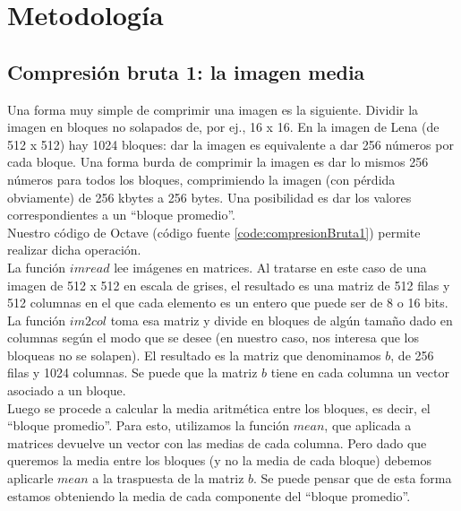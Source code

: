 \documentclass[twocolumn,a4paper,10pt]{article}
\begin{document}

\section{Metodología}

\subsection{Compresi\'on bruta 1: la imagen media}
\label{sec:compresion1}

Una forma muy simple de comprimir una imagen es la siguiente. Dividir la imagen en bloques no solapados de, por ej., 16 x 16. En la imagen de Lena (de 512 x 512) 
hay 1024 bloques: dar la imagen es equivalente a dar 256 n\'umeros por cada bloque. Una forma burda de comprimir la imagen es dar lo mismos 256 n\'umeros para todos 
los bloques, comprimiendo la imagen (con p\'erdida obviamente) de 256 kbytes a 256 bytes. Una posibilidad es dar los valores correspondientes a un ``bloque promedio''.\\

Nuestro c\'odigo de Octave (c\'odigo fuente \ref{code:compresionBruta1}) permite realizar dicha operaci\'on. \\

La funci\'on $imread$ lee im\'agenes en matrices. Al tratarse en este caso de una imagen de 512 x 512 en escala de grises, el resultado es una matriz de 512 filas y 
512 columnas en el que cada elemento es un entero que puede ser de 8 o 16 bits. La funci\'on $im2col$ toma esa matriz y divide en bloques de alg\'un tamaño dado en 
columnas seg\'un el modo que se desee (en nuestro caso, nos interesa que los bloqueas no se solapen). El resultado es la matriz que denominamos $b$, de 256 filas y 
1024 columnas. Se puede que la matriz $b$ tiene en cada columna un vector asociado a un bloque.  \\

Luego se procede a calcular la media aritm\'etica entre los bloques, es decir, el ``bloque promedio''. Para esto, utilizamos la funci\'on $mean$, que aplicada a 
matrices devuelve un vector con las medias de cada columna. Pero dado que queremos la media entre los bloques (y no la media de cada bloque) debemos aplicarle
$mean$ a la traspuesta de la matriz $b$. Se puede pensar que de esta forma estamos obteniendo la media de cada componente del ``bloque promedio''. \\
\end{document}
